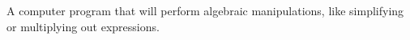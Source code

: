 A computer program that will perform algebraic manipulations, like simplifying 
or multiplying out expressions.
